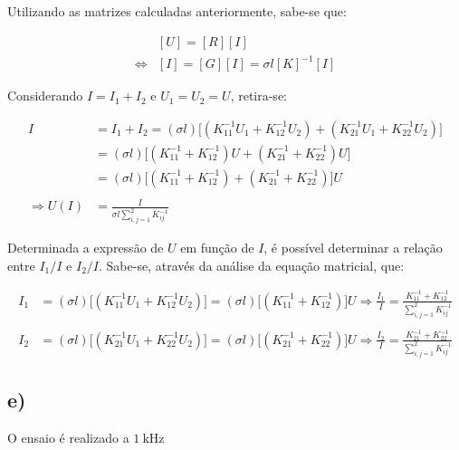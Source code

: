 \documentclass[portuguese, a4paper]{article}
\newcommand{\eq}{\Leftrightarrow} %
\begin{document}
		\par
		Utilizando as matrizes calculadas anteriormente, sabe-se que:

		\begin{align*}
				&[U] = [R][I] \\
			\eq &[I] = [G][I] = \sigma l [K]^{-1}[I]
		\end{align*}

		\par
		Considerando $I = I_1 + I_2$ e $U_1 = U_2 = U$, retira-se: 

		\begin{align*}
				I &= I_1 + I_2 = \left( \sigma l\right) \lbrack \left(K^{-1}_{11}U_1 + K^{-1}_{12}U_2\right) + \left(K^{-1}_{21}U_1 + K^{-1}_{22}U_2\right)\rbrack \\
				  &= \left( \sigma l\right) \lbrack \left(K^{-1}_{11} + K^{-1}_{12}\right)U + \left(K^{-1}_{21} + K^{-1}_{22}\right)U\rbrack \\
				  &= \left( \sigma l\right) \lbrack \left(K^{-1}_{11} + K^{-1}_{12}\right) + \left(K^{-1}_{21} + K^{-1}_{22}\right)\rbrack U\\ \\
	\Rightarrow U(I) &= \frac{I}{\sigma l \sum\limits_{i,j=1}^{2} K^{-1}_{ij}} 
		\end{align*}

		\par
		Determinada a expressão de $U$ em função de $I$, é possível determinar a relação entre $I_1/I$ e $I_2/I$. Sabe-se, através da análise da equação matricial, que:

		\begin{align*}
				I_1 &= \left( \sigma l\right) \lbrack \left(K^{-1}_{11}U_1 + K^{-1}_{12}U_2\right)\rbrack = \left( \sigma l\right) \lbrack \left(K^{-1}_{11} + K^{-1}_{12} \right)	\rbrack U \Rightarrow \frac{I_1}{I} = \frac{K^{-1}_{11} + K^{-1}_{12}} {\sum\limits_{i,j=1}^{2} K^{-1}_{ij}} \\ \\
				I_2 &= \left( \sigma l\right) \lbrack \left(K^{-1}_{21}U_1 + K^{-1}_{22}U_2\right)\rbrack = \left( \sigma l\right) \lbrack \left(K^{-1}_{21} + K^{-1}_{22} \right)	\rbrack U \Rightarrow \frac{I_2}{I} = \frac{K^{-1}_{21} + K^{-1}_{22}} {\sum\limits_{i,j=1}^{2} K^{-1}_{ij}}
		\end{align*}



	\subsection{e)}

		\par
		O ensaio é realizado a $\SI{1}{\kilo\hertz}$
\end{document}
